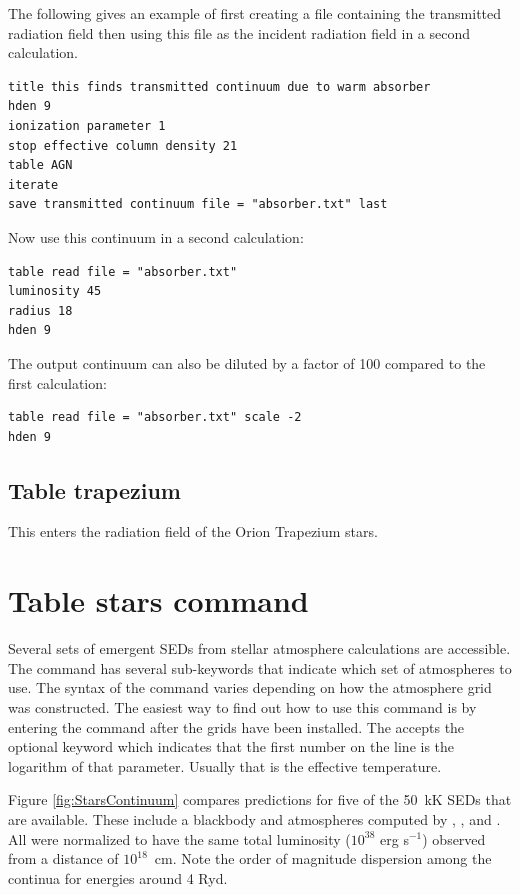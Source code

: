 The following gives an example of first creating a file containing the
transmitted radiation field then using this file as the
incident radiation field in a second calculation.
\begin{verbatim}
title this finds transmitted continuum due to warm absorber
hden 9
ionization parameter 1
stop effective column density 21
table AGN
iterate
save transmitted continuum file = "absorber.txt" last
\end{verbatim}
Now use this continuum in a second calculation:
\begin{verbatim}
table read file = "absorber.txt"
luminosity 45
radius 18
hden 9
\end{verbatim}
The output continuum can also be diluted by a factor of 100 compared
to the first calculation:
\begin{verbatim}
table read file = "absorber.txt" scale -2
hden 9
\end{verbatim}

\subsection{Table trapezium}
\label{sec:CommandTableTrapezium}

This enters the radiation field of the Orion Trapezium stars.


\section{Table stars command}
\label{sect:TableStars}

Several sets of emergent SEDs from stellar atmosphere calculations are
accessible.
The command has several sub-keywords that indicate which set
of atmospheres to use. The syntax of the command varies depending on
how the atmosphere grid was constructed. The easiest way to find out
how to use this command is by entering the command  after the grids have been installed. The 
 accepts the optional keyword 
which indicates that the first number on the line is the logarithm of
that parameter. Usually that is the effective temperature.

Figure \ref{fig:StarsContinuum} compares predictions for
five of the 50~kK SEDs that are
available.  These include a blackbody and atmospheres computed by \citet{Mihalas1972}, \citet{Kurucz1979}, \citet{Kurucz1991} and \citet{Rauch2002}.
All were normalized
to have the same total luminosity ($10^{38}$ erg s$^{-1}$)
observed from a distance of $10^{18}$~cm.
Note the order of magnitude dispersion among the continua for
energies around 4 Ryd.

